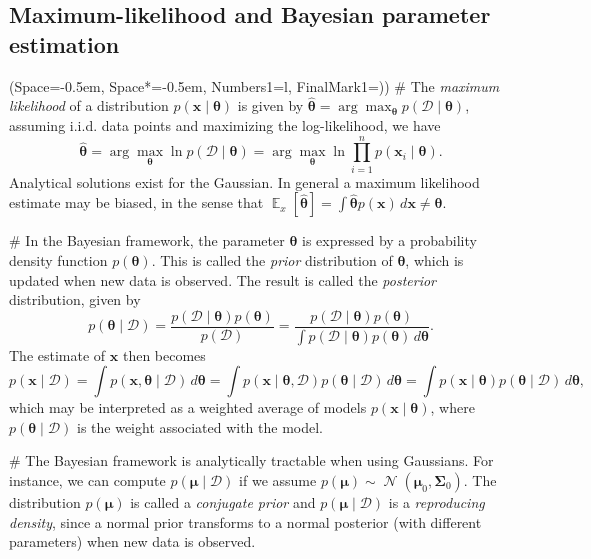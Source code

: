 \documentclass[12pt, a4paper]{article}
\newcommand{\listSpace}{-0.5em}%
\newcommand{\D}{\mathcal{D}}
\newcommand{\vect}[1]{\bm{#1}}
\DeclareMathOperator{\N}{\mathcal{N}}
\DeclareMathOperator{\E}{\mathbb{E}}
\begin{document}
\subsection{Maximum-likelihood and Bayesian parameter estimation}
\begin{easylist}[itemize]
\ListProperties(Space=\listSpace, Space*=\listSpace, Numbers1=l, FinalMark1={)})
# The \emph{maximum likelihood} of a distribution $p(\vect{x} \mid \vect{\theta})$ is given by $\hat{\vect{\theta}} = \arg \max_{\vect{\theta}} p(\D \mid \vect{\theta})$,
assuming i.i.d. data points and maximizing the log-likelihood, we have
\begin{equation*}
	\hat{\vect{\theta}} = \arg \max_{\vect{\theta}} \ln  p(\D \mid \vect{\theta}) = \arg \max_{\vect{\theta}}  \ln  \prod_{i=1}^{n} p(\vect{x}_i \mid \vect{\theta})  .
\end{equation*}
Analytical solutions exist for the Gaussian.
In general a maximum likelihood estimate may be biased, in the sense that $\E_x[ \hat{\vect{\theta}} ] = \int \hat{\vect{\theta}} p(\vect{x}) \, d\vect{x} \neq \vect{\theta}$.

# In the Bayesian framework, the parameter $\vect{\theta}$ is expressed by a probability density function $p(\vect{\theta})$.
This is called the \emph{prior} distribution of $\vect{\theta}$, which is updated when new data is observed.
The result is called the \emph{posterior} distribution, given by
\begin{equation*}
	p(\vect{\theta} \mid \D)  
	= 
	\frac{p(\D \mid \vect{\theta}) p (\vect{\theta})}
	{p(\D)}
	= 
	\frac{p(\D \mid \vect{\theta}) p (\vect{\theta})}
	{\int p(\D \mid \vect{\theta}) p(\vect{\theta}) \, d \vect{\theta}}.
\end{equation*}
The estimate of $\vect{x}$ then becomes
\begin{equation*}
	p(\vect{x} \mid \D) = \int p(\vect{x}, \vect{\theta} \mid \D) \, d\vect{\theta} =
	\int p(\vect{x} \mid \vect{\theta} , \D) p(\vect{\theta} \mid \D)  \, d\vect{\theta} =
	\int p(\vect{x} \mid \vect{\theta}) p(\vect{\theta} \mid \D)  \, d\vect{\theta},
\end{equation*}
which may be interpreted as a weighted average of models $p(\vect{x} \mid \vect{\theta})$, where $p(\vect{\theta} \mid \D)$ is the weight associated with the model.

# The Bayesian framework is analytically tractable when using Gaussians.
For instance, we can compute $p(\vect{\mu} \mid \D)$ if we assume $p(\vect{\mu}) \sim \N(\vect{\mu}_0, \vect{\Sigma}_0)$.
The distribution $p(\vect{\mu})$ is called a \emph{conjugate prior} and $p(\vect{\mu} \mid \D)$ is a \emph{reproducing density}, since a normal prior transforms to a normal posterior (with different parameters) when new data is observed.


\end{easylist}
\end{document}
